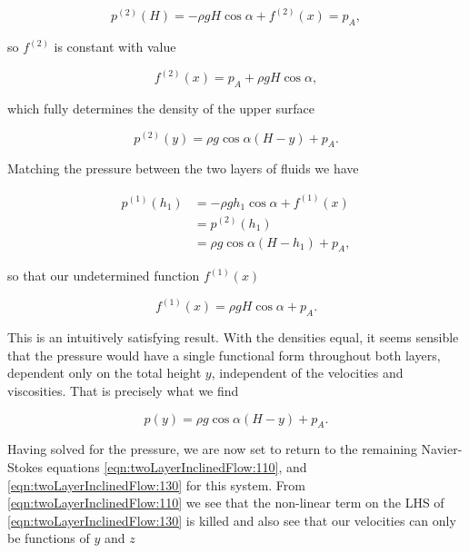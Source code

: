 \begin{equation}\label{eqn:twoLayerInclinedFlow:275}
p^{(2)}(H) = - \rho g H \cos\alpha + f^{(2)}(x) = p_A,
\end{equation}

so $f^{(2)}$ is constant with value

\begin{equation}\label{eqn:twoLayerInclinedFlow:295}
f^{(2)}(x) = p_A + \rho g H \cos\alpha,
\end{equation}

which fully determines the density of the upper surface

\begin{equation}\label{eqn:twoLayerInclinedFlow:315}
p^{(2)}(y) = \rho g \cos\alpha (H - y) + p_A.
\end{equation}

Matching the pressure between the two layers of fluids we have

\begin{align*}
p^{(1)}(h_1) &= - \rho g h_1 \cos\alpha + f^{(1)}(x) \\
             &= p^{(2)}(h_1) \\
             &= \rho g \cos\alpha (H - h_1) + p_A,
\end{align*}

so that our undetermined function $f^{(1)}(x)$ 

\begin{equation}\label{eqn:twoLayerInclinedFlow:335}
f^{(1)}(x) = \rho g H \cos\alpha  + p_A.
\end{equation}

This is an intuitively satisfying result.  With the densities equal, it seems sensible that the pressure would have a single functional form throughout both layers, dependent only on the total height $y$, independent of the velocities and viscosities.  That is precisely what we find

\begin{equation}\label{eqn:twoLayerInclinedFlow:355}
p(y) = \rho g \cos\alpha (H - y) + p_A.
\end{equation}

Having solved for the pressure, we are now set to return to the remaining Navier-Stokes equations \ref{eqn:twoLayerInclinedFlow:110}, and \ref{eqn:twoLayerInclinedFlow:130} for this system.  From \ref{eqn:twoLayerInclinedFlow:110} we see that the non-linear term on the LHS of \ref{eqn:twoLayerInclinedFlow:130} is killed and also see that our velocities can only be functions of $y$ and $z$

